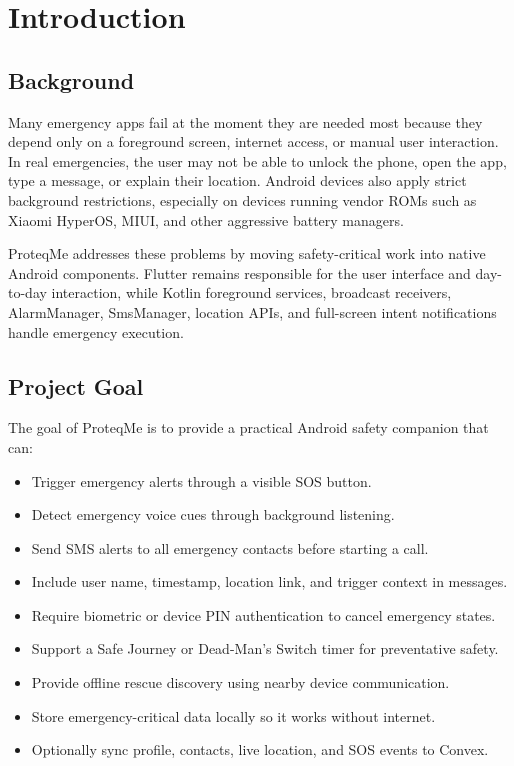 \documentclass[12pt,a4paper]{report}
\newcommand{\projectname}{ProteqMe}
\begin{document}
\chapter{Introduction}

\section{Background}

Many emergency apps fail at the moment they are needed most because they depend only on a foreground screen, internet access, or manual user interaction. In real emergencies, the user may not be able to unlock the phone, open the app, type a message, or explain their location. Android devices also apply strict background restrictions, especially on devices running vendor ROMs such as Xiaomi HyperOS, MIUI, and other aggressive battery managers.

\projectname{} addresses these problems by moving safety-critical work into native Android components. Flutter remains responsible for the user interface and day-to-day interaction, while Kotlin foreground services, broadcast receivers, AlarmManager, SmsManager, location APIs, and full-screen intent notifications handle emergency execution.

\section{Project Goal}

The goal of \projectname{} is to provide a practical Android safety companion that can:

\begin{itemize}
    \item Trigger emergency alerts through a visible SOS button.
    \item Detect emergency voice cues through background listening.
    \item Send SMS alerts to all emergency contacts before starting a call.
    \item Include user name, timestamp, location link, and trigger context in messages.
    \item Require biometric or device PIN authentication to cancel emergency states.
    \item Support a Safe Journey or Dead-Man's Switch timer for preventative safety.
    \item Provide offline rescue discovery using nearby device communication.
    \item Store emergency-critical data locally so it works without internet.
    \item Optionally sync profile, contacts, live location, and SOS events to Convex.
\end{itemize}
\end{document}

